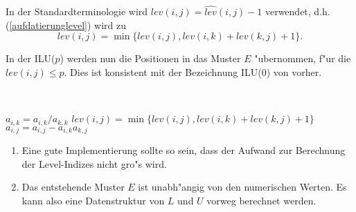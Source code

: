 In der Standardterminologie wird $lev(i,j) = \widehat{lev}(i,j)-1$ verwendet, d.h. (\ref{aufdatierunglevel}) wird zu
\begin{equation}\label{aufdatierungstandard}
lev(i,j) = \min \{lev(i,j) , lev(i,k) + lev(k,j) +1 \}.
\end{equation}

In der ILU($p$) werden nun die Positionen in das Muster $E$ "ubernommen, f"ur
die $lev(i,j) \leq p$. Dies ist konsistent mit der Bezeichnung
ILU(0) von vorher.

\begin{alg}
~               %
\vspace*{-2\baselineskip}       %
\begin{algorithm}
  \begin{algorithmic}
          \STATE $a_{i,k} = a_{i,k}/a_{k,k}$
            \STATE $lev(i,j) = \min \{lev(i,j),lev(i,k) + lev(k,j) + 1\} $
              \STATE $a_{i,j} = a_{i,j} - a_{i,k} a_{k,j}$
            \ENDIF
          \ENDFOR
        \ENDIF
      \ENDFOR
    \ENDFOR
  \end{algorithmic}
\end{algorithm}
\end{alg}

\begin{enumerate}
\item Eine gute Implementierung sollte so sein, dass der Aufwand zur Berechnung der
Level-Indizes nicht gro"s  wird.
\item Das entstehende Muster $E$ ist unabh"angig von den numerischen Werten. Es kann also
eine Datenstruktur von $L$ und $U$ vorweg berechnet werden.
\end{enumerate}

